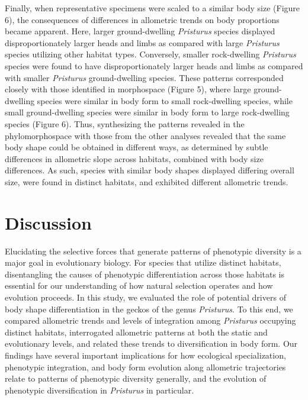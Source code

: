 \documentclass[
  11pt,
]{article}
\begin{document}
Finally, when representative specimens were scaled to a similar body
size (Figure 6), the consequences of differences in allometric trends on
body proportions became apparent. Here, larger ground-dwelling
\emph{Pristurus} species displayed disproportionately larger heads and
limbs as compared with large \emph{Pristurus} species utilizing other
habitat types. Conversely, smaller rock-dwelling \emph{Pristurus}
species were found to have disproportionately larger heads and limbs as
compared with smaller \emph{Pristurus} ground-dwelling species. These
patterns corresponded closely with those identified in morphospace
(Figure 5), where large ground-dwelling species were similar in body
form to small rock-dwelling species, while small ground-dwelling species
were similar in body form to large rock-dwelling species (Figure 6).
Thus, synthesizing the patterns revealed in the phylomorphospace with
those from the other analyses revealed that the same body shape could be
obtained in different ways, as determined by subtle differences in
allometric slope across habitats, combined with body size differences.
As such, species with similar body shapes displayed differing overall
size, were found in distinct habitats, and exhibited different
allometric trends. \hfill\break

\hypertarget{discussion}{%
\section{Discussion}\label{discussion}}

Elucidating the selective forces that generate patterns of phenotypic
diversity is a major goal in evolutionary biology. For species that
utilize distinct habitats, disentangling the causes of phenotypic
differentiation across those habitats is essential for our understanding
of how natural selection operates and how evolution proceeds. In this
study, we evaluated the role of potential drivers of body shape
differentiation in the geckos of the genus \emph{Pristurus}. To this
end, we compared allometric trends and levels of integration among
\emph{Pristurus} occupying distinct habitats, interrogated allometric
patterns at both the static and evolutionary levels, and related these
trends to diversification in body form. Our findings have several
important implications for how ecological specialization, phenotypic
integration, and body form evolution along allometric trajectories
relate to patterns of phenotypic diversity generally, and the evolution
of phenotypic diversification in \emph{Pristurus} in particular.
\hfill\break
\end{document}

